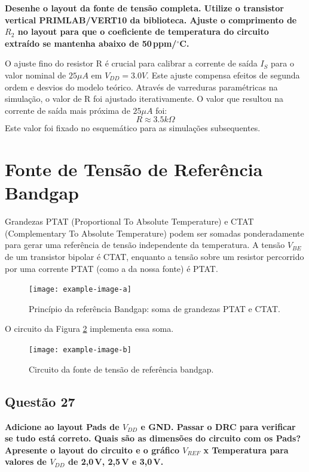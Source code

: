 ﻿\documentclass[12pt,a4paper]{article}
\newcommand{\degree}{\ensuremath{{}^\circ}}
\begin{document}
	\textbf{Desenhe o layout da fonte de tensão completa. Utilize o transistor vertical PRIMLAB/VERT10 da biblioteca. Ajuste o comprimento de $R_2$ no layout para que o coeficiente de temperatura do circuito extraído se mantenha abaixo de 50\,ppm/\degree C.}

O ajuste fino do resistor R é crucial para calibrar a corrente de saída $I_S$ para o valor nominal de $25\mu A$ em $V_{DD} = 3.0V$. Este ajuste compensa efeitos de segunda ordem e desvios do modelo teórico. Através de varreduras paramétricas na simulação, o valor de R foi ajustado iterativamente. O valor que resultou na corrente de saída mais próxima de $25\mu A$ foi:
\begin{equation}
R \approx 3.5k\Omega
\end{equation}
Este valor foi fixado no esquemático para as simulações subsequentes.

\section*{Fonte de Tensão de Referência Bandgap}

Grandezas PTAT (Proportional To Absolute Temperature) e CTAT (Complementary To Absolute Temperature) podem ser somadas ponderadamente para gerar uma referência de tensão independente da temperatura. A tensão $V_{BE}$ de um transistor bipolar é CTAT, enquanto a tensão sobre um resistor percorrido por uma corrente PTAT (como a da nossa fonte) é PTAT.

\begin{figure}[H]
\centering
\texttt{[image: example-image-a]}
\caption{Princípio da referência Bandgap: soma de grandezas PTAT e CTAT.}
\label{fig:bandgap_principle}
\end{figure}

O circuito da Figura \ref{fig:bandgap_circuit} implementa essa soma.

\begin{figure}[H]
\centering
\texttt{[image: example-image-b]}
\caption{Circuito da fonte de tensão de referência bandgap.}
\label{fig:bandgap_circuit}
\end{figure}

\subsection*{Questão 27}
	\textbf{Adicione ao layout Pads de $V_{DD}$ e GND. Passar o DRC para verificar se tudo está correto. Quais são as dimensões do circuito com os Pads? Apresente o layout do circuito e o gráfico $V_{REF}$ x Temperatura para valores de $V_{DD}$ de 2{,}0\,V, 2{,}5\,V e 3{,}0\,V.}
\end{document}

